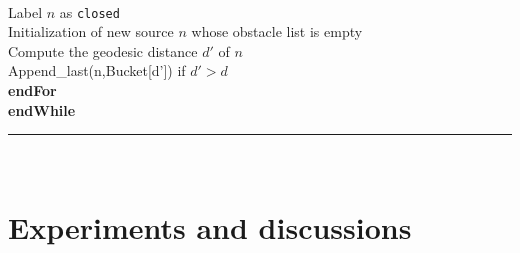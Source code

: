 \documentclass[fleqn,twoside]{article}
\begin{document}
{{\hspace*{1.5cm}{\bf else}\\
\hspace*{2cm} Label $n$ as {\tt closed}\\
\hspace*{2cm} Initialization of new source  $n$ whose obstacle list is empty\\
\hspace*{2cm} Compute the geodesic distance $d'$ of $n$\\
\hspace*{2cm} Append\_last(n,Bucket[d']) if $d'>d$ \\
\hspace*{0.5cm} {\bf endFor}\\
{\bf endWhile}\\
}
\hrule}\ \\




\section{Experiments and discussions}
\end{document}
